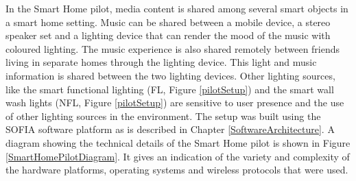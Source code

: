 



In the Smart Home pilot, media content is shared among several smart objects in a smart home setting. Music can be shared between a mobile device, a stereo speaker set and a lighting device that can render the mood of the music with coloured lighting. The music experience is also shared remotely between friends living in separate homes through the lighting device. This light and music information is shared between the two lighting devices. Other lighting sources, like the smart functional lighting (FL, Figure \ref{pilotSetup}) and the smart wall wash lights (NFL, Figure \ref{pilotSetup}) are sensitive to user presence and the use of other lighting sources in the environment. The setup was built using the \ac{SOFIA} software platform as is described in Chapter \ref{SoftwareArchitecture}. A diagram showing the technical details of the Smart Home pilot is shown in Figure \ref{SmartHomePilotDiagram}. It gives an indication of the variety and complexity of the hardware platforms, operating systems and wireless protocols that were used.



